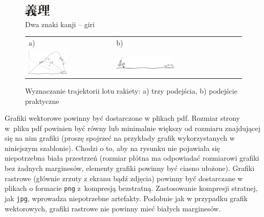 \begin{figure}[ht]
	\centering
		\includegraphics[width=0.3\linewidth]{rys05/kanji-giri}
	\caption{Dwa znaki kanji -- giri}
	\label{fig:kanji-giri}
\end{figure}

\begin{figure}[htb]
  \centering
	\begin{tabular}{@{}ll@{}}
	a) & b) \\
  \includegraphics[width=0.475\textwidth]{rys05/beta1} & 
	\includegraphics[width=0.475\textwidth]{rys05/alfa1}
	\end{tabular}
  \caption{Wyznaczanie trajektorii lotu rakiety: a) trzy podejścia, b) podejście praktyczne}
  \label{fig:alfabeta}
\end{figure}

Grafiki wektorowe powinny być dostarczone w plikach pdf. Rozmiar strony w~pliku pdf powinien być równy lub minimalnie większy od rozmiaru znajdującej się na nim grafiki (proszę spojrzeć na przykłady grafik wykorzystanych w niniejszym szablonie). Chodzi o to, aby na rysunku nie pojawiała się niepotrzebna biała przestrzeń (rozmiar płótna ma odpowiadać rozmiarowi grafiki bez żadnych marginesów, elementy grafiki powinny być ciasno ułożone). Grafiki rastrowe (głównie zrzuty z ekranu bądź zdjęcia) powinny być dostarczane w plikach o formacie \texttt{png} z~kompresją bezstratną. Zastosowanie kompresji stratnej, jak \texttt{jpg}, wprowadza niepotrzebne artefakty. Podobnie jak w przypadku grafik wektorowych, grafiki rastrowe nie powinny mieć białych marginesów.

